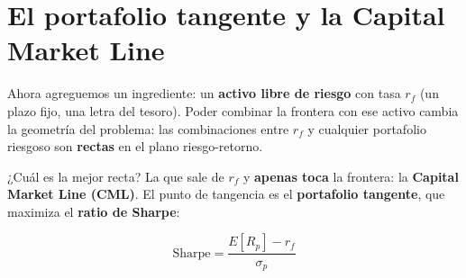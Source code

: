\documentclass[
  spanish,
  letterpaper,
  DIV=11,
  numbers=noendperiod]{scrreprt}
\begin{document}
\section{El portafolio tangente y la Capital Market
Line}\label{el-portafolio-tangente-y-la-capital-market-line}

Ahora agreguemos un ingrediente: un \textbf{activo libre de riesgo} con
tasa \(r_f\) (un plazo fijo, una letra del tesoro). Poder combinar la
frontera con ese activo cambia la geometría del problema: las
combinaciones entre \(r_f\) y cualquier portafolio riesgoso son
\textbf{rectas} en el plano riesgo-retorno.

¿Cuál es la mejor recta? La que sale de \(r_f\) y \textbf{apenas toca}
la frontera: la \textbf{Capital Market Line (CML)}. El punto de
tangencia es el \textbf{portafolio tangente}, que maximiza el
\textbf{ratio de Sharpe}:

\[\text{Sharpe} = \frac{E[R_p] - r_f}{\sigma_p}\]
\end{document}
